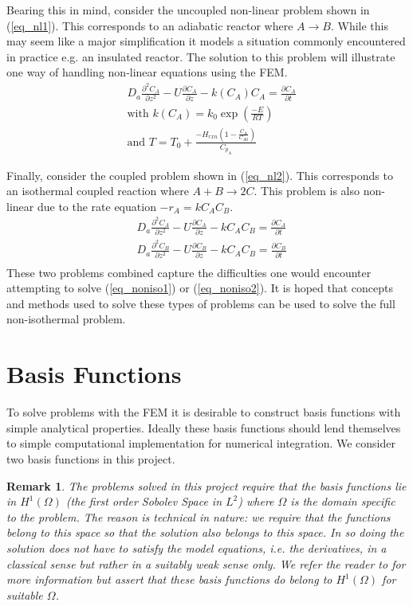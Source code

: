 \documentclass[11pt,fleqn]{article}
\theoremstyle{defstyle}
\newtheorem{rmrk}{Remark}[section]
\begin{document}
Bearing this in mind, consider the uncoupled non-linear problem shown in (\ref{eq_nl1}). This corresponds to an adiabatic reactor where $A \rightarrow B$. While this may seem like a major simplification it models a situation commonly encountered in practice e.g. an insulated reactor. The solution to this problem will illustrate one way of handling non-linear equations using the FEM.
\begin{equation}
\begin{aligned}
&D_a \frac{\partial^2 C_A}{\partial z^2} - U \frac{\partial C_A}{\partial z} - k(C_A)
C_A = \frac{\partial C_A}{\partial t} \\
& \text{with }k(C_A) = k_0 \exp(\frac{-E}{RT}) \\
& \text{and } T = T_0 + \frac{-H_{rxn} (1-\frac{C_A}{C_{A0}})}{C_{p_A}}
\end{aligned}
\label{eq_nl1}
\end{equation}  

Finally, consider the coupled problem shown in (\ref{eq_nl2}). This corresponds to an isothermal coupled reaction where $A + B \rightarrow 2C$. This problem is also non-linear due to the rate equation $-r_A = kC_AC_B$.
\begin{equation}
\begin{aligned}
&D_a \frac{\partial^2 C_A}{\partial z^2} - U \frac{\partial C_A}{\partial z} - kC_AC_B 
= \frac{\partial C_A}{\partial t} \\
&D_a \frac{\partial^2 C_B}{\partial z^2} - U \frac{\partial C_B}{\partial z} - kC_AC_B 
= \frac{\partial C_B}{\partial t} \\
\end{aligned}
\label{eq_nl2}
\end{equation}
These two problems combined capture the difficulties one would encounter attempting to solve (\ref{eq_noniso1}) or (\ref{eq_noniso2}). It is hoped that concepts and methods used to solve these types of problems can be used to solve the full non-isothermal problem.

\section{Basis Functions}
To solve problems with the FEM it is desirable to construct basis functions with simple analytical properties. Ideally these basis functions should lend themselves to simple computational implementation for numerical integration. We consider two basis functions in this project. 
\begin{rmrk}
The problems solved in this project require that the basis functions lie in $H^1(\Omega)$ (the first order Sobolev Space in $L^2$) where $\Omega$ is the domain specific to the problem. The reason is technical in nature: we require that the functions belong to this space so that the solution also belongs to this space. In so doing the solution does not have to satisfy the model equations, i.e. the derivatives, in a classical sense but rather in a suitably weak sense only. We refer the reader to \cite{strang} for more information but assert that these basis functions do belong to $H^1(\Omega)$ for suitable $\Omega$.  
\end{rmrk}
\end{document}
